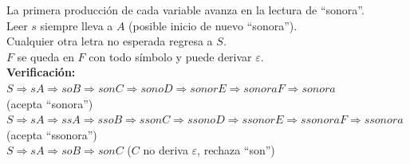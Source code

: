 \documentclass[12pt]{article}
\begin{document}
\begin{enumerate}
{            La primera producción de cada variable avanza en la lectura de ``sonora''. \\
            Leer $s$ siempre lleva a $A$ (posible inicio de nuevo ``sonora''). \\
            Cualquier otra letra no esperada regresa a $S$. \\
            $F$ se queda en $F$ con todo s\'imbolo y puede derivar $\varepsilon$. \\

            \textbf{Verificación:} \\
            $S \Rightarrow sA \Rightarrow soB \Rightarrow sonC \Rightarrow sonoD \Rightarrow sonorE \Rightarrow sonoraF \Rightarrow sonora$ \\
            (acepta ``sonora'') \\
            $S \Rightarrow sA \Rightarrow ssA \Rightarrow ssoB \Rightarrow ssonC \Rightarrow ssonoD \Rightarrow ssonorE \Rightarrow ssonoraF \Rightarrow ssonora$ \\
            (acepta ``ssonora'') \\
            $S \Rightarrow sA \Rightarrow soB \Rightarrow sonC$ \quad ($C$ no deriva $\varepsilon$, rechaza ``son'')
        }
\end{enumerate}



\end{document}
